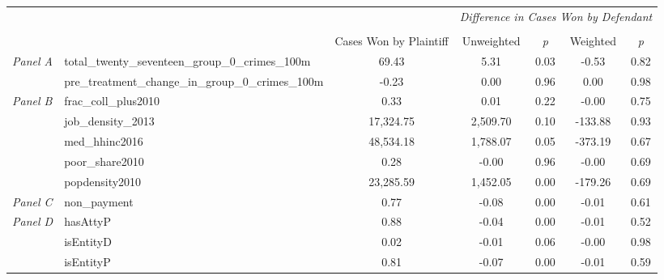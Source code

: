 \begin{tabular}{llccccc}
\toprule
 &  & \textit{} & \multicolumn{4}{c}{\textit{Difference in Cases Won by Defendant}} \\
\cline{4-7}
\\
 &  & Cases Won by Plaintiff & Unweighted & \emph{p} & Weighted & \emph{p} \\
\midrule
\multirow[c]{2}{3cm}{\textit{Panel A}} & total_twenty_seventeen_group_0_crimes_100m & 69.43 & 5.31 & 0.03 & -0.53 & 0.82 \\
 & pre_treatment_change_in_group_0_crimes_100m & -0.23 & 0.00 & 0.96 & 0.00 & 0.98 \\
\cline{1-7}
\multirow[c]{5}{3cm}{\textit{Panel B}} & frac_coll_plus2010 & 0.33 & 0.01 & 0.22 & -0.00 & 0.75 \\
 & job_density_2013 & 17,324.75 & 2,509.70 & 0.10 & -133.88 & 0.93 \\
 & med_hhinc2016 & 48,534.18 & 1,788.07 & 0.05 & -373.19 & 0.67 \\
 & poor_share2010 & 0.28 & -0.00 & 0.96 & -0.00 & 0.69 \\
 & popdensity2010 & 23,285.59 & 1,452.05 & 0.00 & -179.26 & 0.69 \\
\cline{1-7}
\textit{Panel C} & non_payment & 0.77 & -0.08 & 0.00 & -0.01 & 0.61 \\
\cline{1-7}
\multirow[c]{3}{3cm}{\textit{Panel D}} & hasAttyP & 0.88 & -0.04 & 0.00 & -0.01 & 0.52 \\
 & isEntityD & 0.02 & -0.01 & 0.06 & -0.00 & 0.98 \\
 & isEntityP & 0.81 & -0.07 & 0.00 & -0.01 & 0.59 \\
\cline{1-7}
\bottomrule
\end{tabular}
